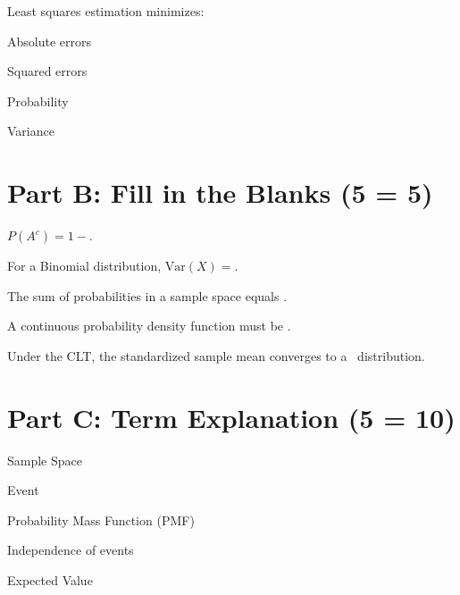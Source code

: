 \documentclass{USTBExam}
\begin{document}
\begin{question}
Least squares estimation minimizes:
\paren
\begin{choices}
\item Absolute errors
\item Squared errors
\item Probability
\item Variance
\end{choices}
\end{question}

\section{Part B: Fill in the Blanks (5  = 5)}

\begin{question}
$P(A^c)=1-$\fillin.
\end{question}

\begin{question}
For a Binomial distribution, $\mathrm{Var}(X)=$\fillin.
\end{question}

\begin{question}
The sum of probabilities in a sample space equals \fillin.
\end{question}

\begin{question}
A continuous probability density function must be \fillin.
\end{question}

\begin{question}
Under the CLT, the standardized sample mean converges to a \fillin\ distribution.
\end{question}

\section{Part C: Term Explanation (5  = 10)}

\begin{problem}Sample Space\end{problem}
\begin{problem}Event\end{problem}
\begin{problem}Probability Mass Function (PMF)\end{problem}
\begin{problem}Independence of events\end{problem}
\begin{problem}Expected Value\end{problem}
\end{document}
